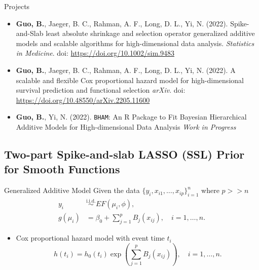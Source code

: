 \documentclass[
  ignorenonframetext,
  aspectratio=169]{beamer}
\providecommand{\tightlist}{%
  \setlength{\itemsep}{0pt}\setlength{\parskip}{0pt}}
\begin{document}
\begin{frame}[fragile]{Projects}
\protect\hypertarget{projects}{}
\begin{itemize}
\item
  \textbf{Guo, B.}, Jaeger, B. C., Rahman, A. F., Long, D. L., Yi, N.
  (2022). Spike-and-Slab least absolute shrinkage and selection operator
  generalized additive models and scalable algorithms for
  high-dimensional data analysis. \emph{Statistics in Medicine}. doi:
  \url{https://doi.org/10.1002/sim.9483}
\item
  \textbf{Guo, B.}, Jaeger, B. C., Rahman, A. F., Long, D. L., Yi, N.
  (2022). A scalable and flexible Cox proportional hazard model for
  high-dimensional survival prediction and functional selection
  \emph{arXiv}. doi: \url{https://doi.org/10.48550/arXiv.2205.11600}
\item
  \textbf{Guo, B.}, Yi, N. (2022). \texttt{BHAM}: An R Package to Fit
  Bayesian Hierarchical Additive Models for High-dimensional Data
  Analysis \emph{Work in Progress}
\end{itemize}
\end{frame}

\hypertarget{two-part-spike-and-slab-lasso-ssl-prior-for-smooth-functions}{%
\subsection{Two-part Spike-and-slab LASSO (SSL) Prior for Smooth
Functions}\label{two-part-spike-and-slab-lasso-ssl-prior-for-smooth-functions}}

\begin{frame}{Generalized Additive Model}
\protect\hypertarget{generalized-additive-model}{}
Given the data \(\{y_i, x_{i1}, \dots ,x_{ip}\}_{i=1}^n\) where
\(p >> n\) \begin{align*}
y_i &\overset{\text{i.i.d.}}{\sim} EF(\mu_i, \phi),\\
g(\mu_i) &= \beta_0 + \sum\limits^p_{j=1}B_j(x_{ij}) , \quad i = 1, \dots, n.
\end{align*}

\begin{itemize}
\tightlist
\item
  Cox proportional hazard model with event time \(t_i\) \[
  h(t_i) = h_0(t_i)\exp(\sum\limits^p_{j=1}B_j(x_{ij})) , \quad i = 1, \dots, n.
  \]
\end{itemize}
\end{frame}
\end{document}
